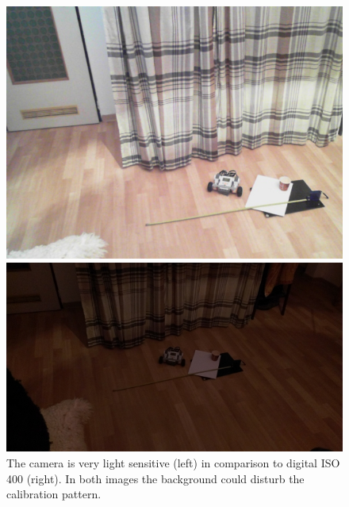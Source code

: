\documentclass{scrartcl}
\begin{document}


\begin{figure}[H]
\centering
\begin{minipage}{.5\textwidth}
  \centering
  \includegraphics[width=.8\linewidth]{img/testimgbad.jpg}
\end{minipage}%
\begin{minipage}{.5\textwidth}
  \centering
  \includegraphics[width=.8\linewidth]{img/iso400.jpg}
\end{minipage}
\caption{The camera is very light sensitive (left) in comparison to digital ISO 400 (right). In both images the background could disturb the calibration pattern.}
\label{fig:brightness}
\end{figure}



\end{document}
